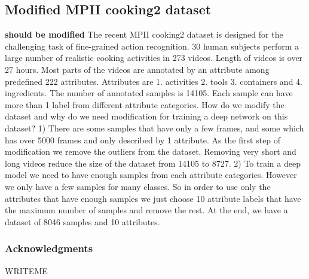 \documentclass{article} %
\begin{document}
\subsection{Modified MPII cooking2 dataset}
\textbf{should be modified} The recent MPII cooking2 dataset is designed for the challenging task of fine-grained action recognition. 30 human subjects perform a large number of realistic cooking activities in 273 videos. Length of videos is over 27 hours. Most parts of the videos are annotated by an attribute among predefined 222 attributes. Attributes are 1. activities 2. tools 3. containers and 4. ingredients. The number of annotated samples is 14105. Each sample can have more than 1 label from different attribute categories. 
How do we modify the dataset and why do we need modification for training a deep network on this dataset? 
1) There are some samples that have only a few frames, and some which has over 5000 frames and only described by 1 attribute. As the first step of modification we remove the outliers from the dataset. Removing very short and long videos reduce the size of the dataset from 14105 to 8727.
2) To train a deep model we need to have enough samples from each attribute categories. However we only have a few samples for many classes. So in order to use only the attributes that have enough samples we just choose 10 attribute labels that have the maximum number of samples and remove the rest. At the end, we have a dataset of 8046 samples and 10 attributes.
\subsubsection*{Acknowledgments}

WRITEME



\end{document}
